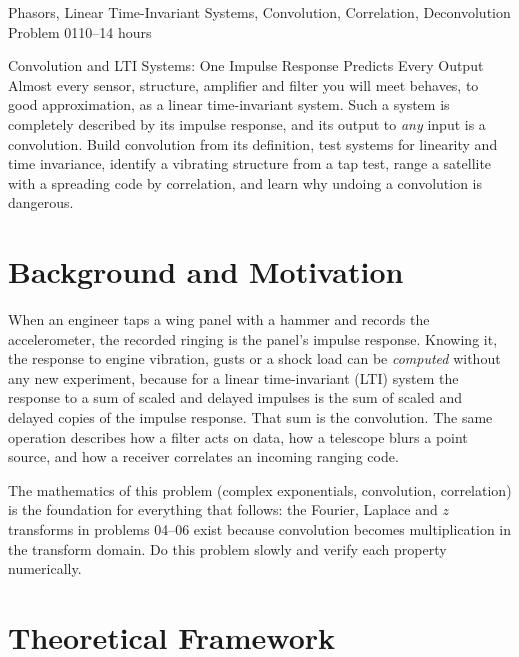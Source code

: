 \documentclass[11pt,a4paper]{article}
\begin{document}
%
{Phasors, Linear Time-Invariant Systems, Convolution, Correlation, Deconvolution}%
{Problem 01}{10--14 hours}

\begin{summarybox}{Convolution and LTI Systems: One Impulse Response Predicts Every Output}
Almost every sensor, structure, amplifier and filter you will meet behaves, to good approximation, as a linear time-invariant system. Such a system is completely described by its impulse response, and its output to \emph{any} input is a convolution. Build convolution from its definition, test systems for linearity and time invariance, identify a vibrating structure from a tap test, range a satellite with a spreading code by correlation, and learn why undoing a convolution is dangerous.
\end{summarybox}


\section*{Background and Motivation}
When an engineer taps a wing panel with a hammer and records the accelerometer, the recorded ringing is the panel's impulse response. Knowing it, the response to engine vibration, gusts or a shock load can be \emph{computed} without any new experiment, because for a linear time-invariant (LTI) system the response to a sum of scaled and delayed impulses is the sum of scaled and delayed copies of the impulse response. That sum is the convolution. The same operation describes how a filter acts on data, how a telescope blurs a point source, and how a receiver correlates an incoming ranging code.

The mathematics of this problem (complex exponentials, convolution, correlation) is the foundation for everything that follows: the Fourier, Laplace and $z$ transforms in problems 04--06 exist because convolution becomes multiplication in the transform domain. Do this problem slowly and verify each property numerically.

\section*{Theoretical Framework}
\end{document}
